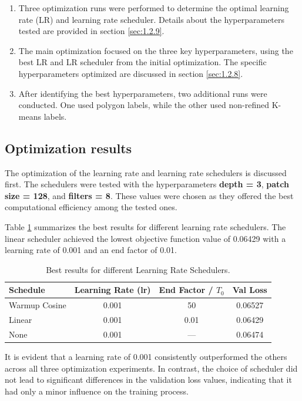 \begin{enumerate}
    \item Three optimization runs were performed to determine the optimal learning rate (LR) and learning rate scheduler. Details about the hyperparameters tested are provided in section \ref{sec:1.2.9}.
    \item The main optimization focused on the three key hyperparameters, using the best LR and LR scheduler from the initial optimization. The specific hyperparameters optimized are discussed in section \ref{sec:1.2.8}.
    \item After identifying the best hyperparameters, two additional runs were conducted. One used polygon labels, while the other used non-refined K-means labels.
\end{enumerate}
\subsection{Optimization results}

The optimization of the learning rate and learning rate schedulers is discussed first. The schedulers were tested with the hyperparameters \textbf{depth = 3}, \textbf{patch size = 128}, and \textbf{filters = 8}. These values were chosen as they offered the best computational efficiency among the tested ones. 

Table \ref{tab:scheduler_results} summarizes the best results for different learning rate schedulers. The linear scheduler achieved the lowest objective function value of 0.06429 with a learning rate of 0.001 and an end factor of 0.01. 

\begin{table}[H]
    \centering
    \caption{Best results for different Learning Rate Schedulers.}
    \begin{tabular}{lccc}
        \toprule
        Schedule & Learning Rate (lr) & End Factor / \( T_0 \) & Val Loss \\
        \midrule
        Warmup Cosine & 0.001 & 50 & 0.06527 \\
        Linear & 0.001 & 0.01 & 0.06429 \\
        None & 0.001 & --- &  0.06474 \\
        \bottomrule
    \end{tabular}
    \label{tab:scheduler_results}
\end{table}

It is evident that a learning rate of 0.001 consistently outperformed the others across all three optimization experiments. In contrast, the choice of scheduler did not lead to significant differences in the validation loss values, indicating that it had only a minor influence on the training process.


